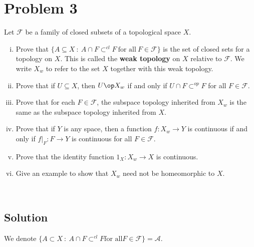 \documentclass{article}
\theoremstyle{definition}
\begin{document}
\section*{Problem 3}
Let $\mathcal{F}$ be a family of closed subsets of a topological space $X$.
\begin{enumerate}[i.]
\item Prove that $\{A \subseteq X\ :\ A \cap F \subset^{cl} F\ \mbox{for all}\ F \in \mathcal{F}\}$ is the set of closed sets for a topology on $X$. This is called the \textbf{weak topology} on $X$ relative to $\mathcal{F}$. We write $X_w$ to refer to the set $X$ together with this weak topology.
\item Prove that if $U \subseteq X$, then $U \op X_w$ if and only if $U \cap F \subset^{op} F$ for all $F \in \mathcal{F}$.
\item Prove that for each $F \in \mathcal{F}$, the subspace topology inherited from $X_w$ is the same as the subspace topology inherited from $X$.
\item Prove that if $Y$ is any space, then a function $f:X_w \rightarrow Y$ is continuous if and only if $f|_F: F \rightarrow Y$ is continuous for all $F \in \mathcal{F}$.
\item Prove that the identity function $1_X: X_w \rightarrow X$ is continuous.
\item Give an example to show that $X_w$ need not be homeomorphic to $X$.
\end{enumerate}
\\ \hline
    \subsection*{Solution}
    We denote $\{A \subset X \ : \ A \cap F \subset^{cl} F \text{for all} F \in \mathcal{F}\} = \mathcal{A}$.
\end{document}
